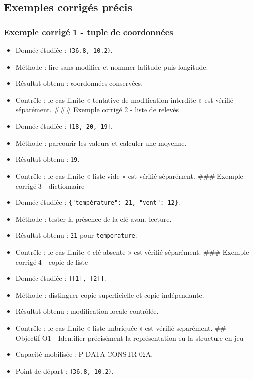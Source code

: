 \subsection{Exemples corrigés précis}

\subsubsection{Exemple corrigé 1 - tuple de coordonnées}

\begin{itemize}
\tightlist
\item
  Donnée étudiée : \texttt{(36.8,\ 10.2)}.
\item
  Méthode : lire sans modifier et nommer latitude puis longitude.
\item
  Résultat obtenu : coordonnées conservées.
\item
  Contrôle : le cas limite « tentative de modification interdite » est
  vérifié séparément. \#\#\# Exemple corrigé 2 - liste de relevés
\item
  Donnée étudiée : \texttt{{[}18,\ 20,\ 19{]}}.
\item
  Méthode : parcourir les valeurs et calculer une moyenne.
\item
  Résultat obtenu : \texttt{19}.
\item
  Contrôle : le cas limite « liste vide » est vérifié séparément. \#\#\#
  Exemple corrigé 3 - dictionnaire
\item
  Donnée étudiée : \texttt{\{"température":\ 21,\ "vent":\ 12\}}.
\item
  Méthode : tester la présence de la clé avant lecture.
\item
  Résultat obtenu : \texttt{21} pour \texttt{temperature}.
\item
  Contrôle : le cas limite « clé absente » est vérifié séparément.
  \#\#\# Exemple corrigé 4 - copie de liste
\item
  Donnée étudiée : \texttt{{[}{[}1{]},\ {[}2{]}{]}}.
\item
  Méthode : distinguer copie superficielle et copie indépendante.
\item
  Résultat obtenu : modification locale contrôlée.
\item
  Contrôle : le cas limite « liste imbriquée » est vérifié séparément.
  \#\# Objectif O1 - Identifier précisément la représentation ou la
  structure en jeu
\item
  Capacité mobilisée : P-DATA-CONSTR-02A.
\item
  Point de départ : \texttt{(36.8,\ 10.2)}.

\end{itemize}
